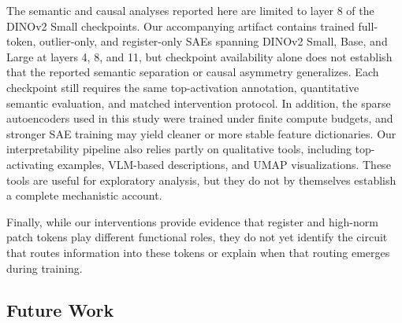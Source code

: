 \documentclass{article}
\theoremstyle{plain}
\theoremstyle{definition}
\theoremstyle{remark}
\begin{document}
The semantic and causal analyses reported here are limited to layer 8 of the DINOv2 Small checkpoints. Our accompanying artifact contains trained full-token, outlier-only, and register-only SAEs spanning DINOv2 Small, Base, and Large at layers 4, 8, and 11, but checkpoint availability alone does not establish that the reported semantic separation or causal asymmetry generalizes. Each checkpoint still requires the same top-activation annotation, quantitative semantic evaluation, and matched intervention protocol. In addition, the sparse autoencoders used in this study were trained under finite compute budgets, and stronger SAE training may yield cleaner or more stable feature dictionaries. Our interpretability pipeline also relies partly on qualitative tools, including top-activating examples, VLM-based descriptions, and UMAP visualizations. These tools are useful for exploratory analysis, but they do not by themselves establish a complete mechanistic account.

Finally, while our interventions provide evidence that register and high-norm patch tokens play different functional roles, they do not yet identify the circuit that routes information into these tokens or explain when that routing emerges during training.

\subsection{Future Work}
\end{document}
